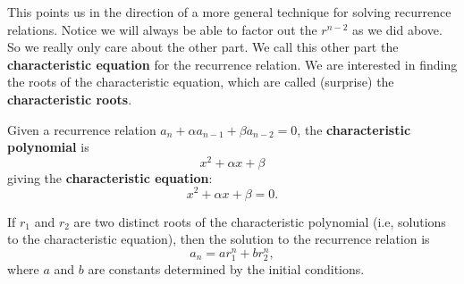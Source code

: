 \documentclass[11pt,]{book}
\newcommand{\terminology}[1]{\textbf{#1}}
\theoremstyle{ptxplainnotitle}
\theoremstyle{ptxplaintitle}
\theoremstyle{ptxdefinitionnotitle}
\theoremstyle{ptxdefinitiontitle}
\theoremstyle{ptxdefinitionnotitle}
\theoremstyle{ptxdefinitiontitle}
\theoremstyle{ptxdefinitionnotitle}
\theoremstyle{ptxdefinitiontitle}
\theoremstyle{ptxdefinitiontitlenonumber}
\theoremstyle{ptxdefinitiontitlenonumber}
\numberwithin{equation}{chapter}
\begin{document}
\par
\hypertarget{p-457}{}%
This points us in the direction of a more general technique for solving recurrence relations. Notice we will always be able to factor out the \(r^{n-2}\) as we did above. So we really only care about the other part. We call this other part the \terminology{characteristic equation} for the recurrence relation. We are interested in finding the roots of the characteristic equation, which are called (surprise) the \terminology{characteristic roots}.%
\begin{assemblage}\label{assemblage-6}
\hypertarget{p-458}{}%
 Given a recurrence relation \(a_n + \alpha a_{n-1} + \beta a_{n-2} = 0\), the \terminology{characteristic polynomial} is%
\begin{equation*}
x^2 + \alpha x + \beta
\end{equation*}
giving the \terminology{characteristic equation}:%
\begin{equation*}
x^2 + \alpha x + \beta = 0.
\end{equation*}
%
\par
\hypertarget{p-459}{}%
If \(r_1\) and \(r_2\) are two distinct roots of the characteristic polynomial (i.e, solutions to the characteristic equation), then the solution to the recurrence relation is%
\begin{equation*}
a_n = ar_1^n + br_2^n,
\end{equation*}
where \(a\) and \(b\) are constants determined by the initial conditions.%
\end{assemblage}
\end{document}
